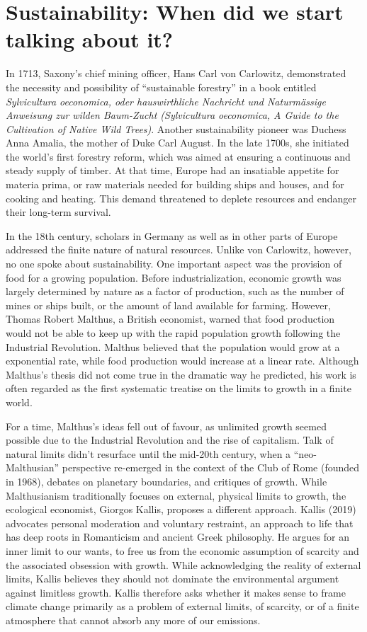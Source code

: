 \documentclass[
  a4paper,
  openany]{book}
\begin{document}
\section{Sustainability: When did we start talking about
it?}\label{sustainability-when-did-we-start-talking-about-it}

In 1713, Saxony's chief mining officer, Hans Carl von Carlowitz,
demonstrated the necessity and possibility of ``sustainable forestry''
in a book entitled \emph{Sylvicultura oeconomica, oder hauswirthliche
Nachricht und Naturmässige Anweisung zur wilden Baum-Zucht (Sylvicultura
oeconomica, A Guide to the Cultivation of Native Wild Trees)}. Another
sustainability pioneer was Duchess Anna Amalia, the mother of Duke Carl
August. In the late 1700s, she initiated the world's first forestry
reform, which was aimed at ensuring a continuous and steady supply of
timber. At that time, Europe had an insatiable appetite for materia
prima, or raw materials needed for building ships and houses, and for
cooking and heating. This demand threatened to deplete resources and
endanger their long-term survival.

In the 18th century, scholars in Germany as well as in other parts of
Europe addressed the finite nature of natural resources. Unlike von
Carlowitz, however, no one spoke about sustainability. One important
aspect was the provision of food for a growing population. Before
industrialization, economic growth was largely determined by nature as a
factor of production, such as the number of mines or ships built, or the
amount of land available for farming. However, Thomas Robert Malthus, a
British economist, warned that food production would not be able to keep
up with the rapid population growth following the Industrial Revolution.
Malthus believed that the population would grow at a exponential rate,
while food production would increase at a linear rate. Although
Malthus's thesis did not come true in the dramatic way he predicted, his
work is often regarded as the first systematic treatise on the limits to
growth in a finite world.

For a time, Malthus's ideas fell out of favour, as unlimited growth
seemed possible due to the Industrial Revolution and the rise of
capitalism. Talk of natural limits didn't resurface until the mid-20th
century, when a ``neo-Malthusian'' perspective re-emerged in the context
of the Club of Rome (founded in 1968), debates on planetary boundaries,
and critiques of growth. While Malthusianism traditionally focuses on
external, physical limits to growth, the ecological economist, Giorgos
Kallis, proposes a different approach. Kallis (2019) advocates personal
moderation and voluntary restraint, an approach to life that has deep
roots in Romanticism and ancient Greek philosophy. He argues for an
inner limit to our wants, to free us from the economic assumption of
scarcity and the associated obsession with growth. While acknowledging
the reality of external limits, Kallis believes they should not dominate
the environmental argument against limitless growth. Kallis therefore
asks whether it makes sense to frame climate change primarily as a
problem of external limits, of scarcity, or of a finite atmosphere that
cannot absorb any more of our emissions.
\end{document}
